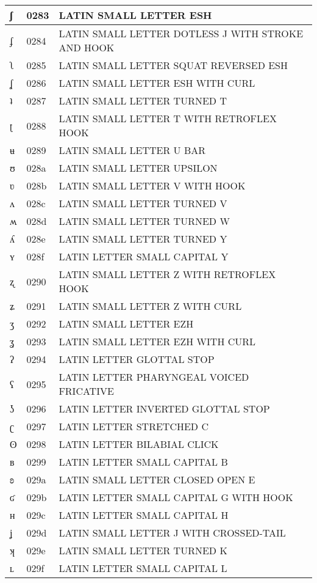 \documentclass[12pt,letterpaper,openany]{book}
\begin{document}
\begin{center}
\begin{supertabular}{|m{0.25in}|m{0.5in}|m{4in}|}
ʃ & 0283 & LATIN SMALL LETTER ESH\\\hline
ʄ & 0284 & LATIN SMALL LETTER DOTLESS J WITH STROKE AND HOOK\\\hline
ʅ & 0285 & LATIN SMALL LETTER SQUAT REVERSED ESH\\\hline
ʆ & 0286 & LATIN SMALL LETTER ESH WITH CURL\\\hline
ʇ & 0287 & LATIN SMALL LETTER TURNED T\\\hline
ʈ & 0288 & LATIN SMALL LETTER T WITH RETROFLEX HOOK\\\hline
ʉ & 0289 & LATIN SMALL LETTER U BAR\\\hline
ʊ & 028a & LATIN SMALL LETTER UPSILON\\\hline
ʋ & 028b & LATIN SMALL LETTER V WITH HOOK\\\hline
ʌ & 028c & LATIN SMALL LETTER TURNED V\\\hline
ʍ & 028d & LATIN SMALL LETTER TURNED W\\\hline
ʎ & 028e & LATIN SMALL LETTER TURNED Y\\\hline
ʏ & 028f & LATIN LETTER SMALL CAPITAL Y\\\hline
ʐ & 0290 & LATIN SMALL LETTER Z WITH RETROFLEX HOOK\\\hline
ʑ & 0291 & LATIN SMALL LETTER Z WITH CURL\\\hline
ʒ & 0292 & LATIN SMALL LETTER EZH\\\hline
ʓ & 0293 & LATIN SMALL LETTER EZH WITH CURL\\\hline
ʔ & 0294 & LATIN LETTER GLOTTAL STOP\\\hline
ʕ & 0295 & LATIN LETTER PHARYNGEAL VOICED FRICATIVE\\\hline
ʖ & 0296 & LATIN LETTER INVERTED GLOTTAL STOP\\\hline
ʗ & 0297 & LATIN LETTER STRETCHED C\\\hline
ʘ & 0298 & LATIN LETTER BILABIAL CLICK\\\hline
ʙ & 0299 & LATIN LETTER SMALL CAPITAL B\\\hline
ʚ & 029a & LATIN SMALL LETTER CLOSED OPEN E\\\hline
ʛ & 029b & LATIN LETTER SMALL CAPITAL G WITH HOOK\\\hline
ʜ & 029c & LATIN LETTER SMALL CAPITAL H\\\hline
ʝ & 029d & LATIN SMALL LETTER J WITH CROSSED-TAIL\\\hline
ʞ & 029e & LATIN SMALL LETTER TURNED K\\\hline
ʟ & 029f & LATIN LETTER SMALL CAPITAL L\\\hline

\end{supertabular}
\end{center}
\end{document}
